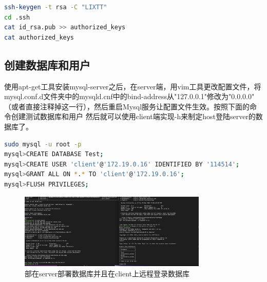 \documentclass{article}
\begin{document}
\begin{lstlisting}[language=bash]
ssh-keygen -t rsa -C "LIXTT"
cd .ssh
cat id_rsa.pub >> authorized_keys
cat authorized_keys
\end{lstlisting}

\subsection{创建数据库和用户}

使用apt-get工具安装mysql-server之后，在server端，用vim工具更改配置文件，将mysql.conf.d文件夹中的mysqld.cnf中的bind-address从"127.0.0.1"修改为"0.0.0.0"
（或者直接注释掉这一行），然后重启Mysql服务让配置文件生效。按照下面的命令创建测试数据库和用户
然后就可以使用client端实现-h来制定host登陆server的数据库了。
\begin{lstlisting}[language=bash]
sudo mysql -u root -p
mysql>CREATE DATABASE Test;
mysql>CREATE USER 'client'@'172.19.0.16' IDENTIFIED BY '114514';
mysql>GRANT ALL ON *.* TO 'client'@'172.19.0.16';
mysql>FLUSH PRIVILEGES;
\end{lstlisting}
\begin{figure}
    \centering
    \includegraphics[width=0.8\textwidth]{deploy_mysql.png}
    \caption{部在server部署数据库并且在client上远程登录数据库}
\end{figure}
\end{document}
